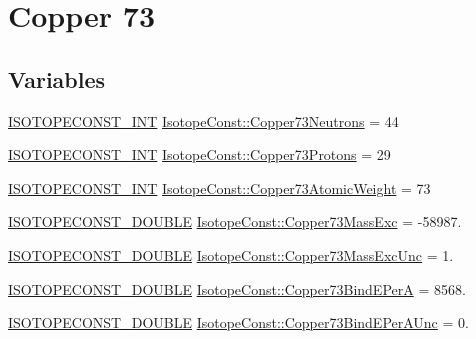 \hypertarget{group___isotope_const-_copper-_cu73}{}\section{Copper 73}
\label{group___isotope_const-_copper-_cu73}
\subsection*{Variables}
\begin{DoxyCompactItemize}
\item 
\mbox{\hyperlink{group___isotope_const-_macros_ga5f18360b3e99483a35c32d789e62621c}{I\+S\+O\+T\+O\+P\+E\+C\+O\+N\+S\+T\+\_\+\+I\+NT}} \mbox{\hyperlink{group___isotope_const-_copper-_cu73_gad438db828beb4c6b0fef0e0be5ec3712}{Isotope\+Const\+::\+Copper73\+Neutrons}} = 44
\item 
\mbox{\hyperlink{group___isotope_const-_macros_ga5f18360b3e99483a35c32d789e62621c}{I\+S\+O\+T\+O\+P\+E\+C\+O\+N\+S\+T\+\_\+\+I\+NT}} \mbox{\hyperlink{group___isotope_const-_copper-_cu73_ga5b4e16751b39bbf8f827a021c20abe37}{Isotope\+Const\+::\+Copper73\+Protons}} = 29
\item 
\mbox{\hyperlink{group___isotope_const-_macros_ga5f18360b3e99483a35c32d789e62621c}{I\+S\+O\+T\+O\+P\+E\+C\+O\+N\+S\+T\+\_\+\+I\+NT}} \mbox{\hyperlink{group___isotope_const-_copper-_cu73_gad053ac96199c0f7a4ee7fc66c811d975}{Isotope\+Const\+::\+Copper73\+Atomic\+Weight}} = 73
\item 
\mbox{\hyperlink{group___isotope_const-_macros_ga8f45a7272ce02c0b4c65c44636ed719a}{I\+S\+O\+T\+O\+P\+E\+C\+O\+N\+S\+T\+\_\+\+D\+O\+U\+B\+LE}} \mbox{\hyperlink{group___isotope_const-_copper-_cu73_ga3803435a762c0d1f77d38e93e1871bfe}{Isotope\+Const\+::\+Copper73\+Mass\+Exc}} = -\/58987.
\item 
\mbox{\hyperlink{group___isotope_const-_macros_ga8f45a7272ce02c0b4c65c44636ed719a}{I\+S\+O\+T\+O\+P\+E\+C\+O\+N\+S\+T\+\_\+\+D\+O\+U\+B\+LE}} \mbox{\hyperlink{group___isotope_const-_copper-_cu73_ga97712e2bf297683460fda67871167f2c}{Isotope\+Const\+::\+Copper73\+Mass\+Exc\+Unc}} = 1.
\item 
\mbox{\hyperlink{group___isotope_const-_macros_ga8f45a7272ce02c0b4c65c44636ed719a}{I\+S\+O\+T\+O\+P\+E\+C\+O\+N\+S\+T\+\_\+\+D\+O\+U\+B\+LE}} \mbox{\hyperlink{group___isotope_const-_copper-_cu73_gaade442943d3633d180f035f3e9a1188b}{Isotope\+Const\+::\+Copper73\+Bind\+E\+PerA}} = 8568.
\item 
\mbox{\hyperlink{group___isotope_const-_macros_ga8f45a7272ce02c0b4c65c44636ed719a}{I\+S\+O\+T\+O\+P\+E\+C\+O\+N\+S\+T\+\_\+\+D\+O\+U\+B\+LE}} \mbox{\hyperlink{group___isotope_const-_copper-_cu73_ga2468745c33f272b056e09815b24a6319}{Isotope\+Const\+::\+Copper73\+Bind\+E\+Per\+A\+Unc}} = 0.

\end{DoxyCompactItemize}
